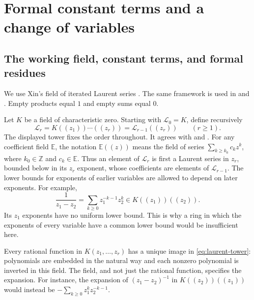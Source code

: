\documentclass[reqno, 12pt]{article}
\numberwithin{equation}{section}
\theoremstyle{definition}
\newcommand{\ZZ}{\mathbb Z}
\begin{document}
\section{Formal constant terms and a change of variables}\label{sec:ct}

\subsection{The working field, constant terms, and formal residues}

We use Xin's field of iterated Laurent series \cite[Sections~2-1 and~2-2]{XinThesis}.  The same framework is used in \cite[Section~2]{XinFast} and \cite{XinEuclid}.  Empty products equal $1$ and empty sums equal $0$.

Let $K$ be a field of characteristic zero.  Starting with
$\mathcal L_0=K$, define recursively
\begin{equation}\label{eq:laurent-tower}
\mathcal L_r=K((z_1))\cdots((z_r))
             =\mathcal L_{r-1}((z_r))\qquad(r\geq1).
\end{equation}
The displayed tower fixes the order throughout.  It agrees with
\cite[Section~2-1]{XinThesis} and \cite[Section~2]{XinFast}.
For any coefficient field $\mathbb{E}$, the notation $\mathbb{E}((z))$ means the field
of series $\sum_{k\geq k_0}c_kz^k$, where $k_0\in\ZZ$ and
$c_k\in \mathbb{E}$.  Thus an element of $\mathcal L_r$ is first a Laurent
series in $z_r$, bounded below in its $z_r$ exponent, whose
coefficients are elements of $\mathcal L_{r-1}$.  The lower bounds
for exponents of earlier variables are allowed to depend on later
exponents.  For example,
\[
\frac1{z_1-z_2}=\sum_{k\geq0}z_1^{-k-1}z_2^k
               \in K((z_1))((z_2)).
\]
Its $z_1$ exponents have no uniform lower bound.  This is why a ring
in which the exponents of every variable have a common lower bound
would be insufficient here.

Every rational function in $K(z_1,\ldots,z_r)$ has a unique image
in \eqref{eq:laurent-tower}: polynomials are embedded in the
natural way and each nonzero polynomial is inverted in this field.
The field, and not just the rational function, specifies the
expansion.  For instance, the expansion of $(z_1-z_2)^{-1}$ in
$K((z_2))((z_1))$ would instead be
$-\sum_{k\geq0}z_1^kz_2^{-k-1}$.
\end{document}
